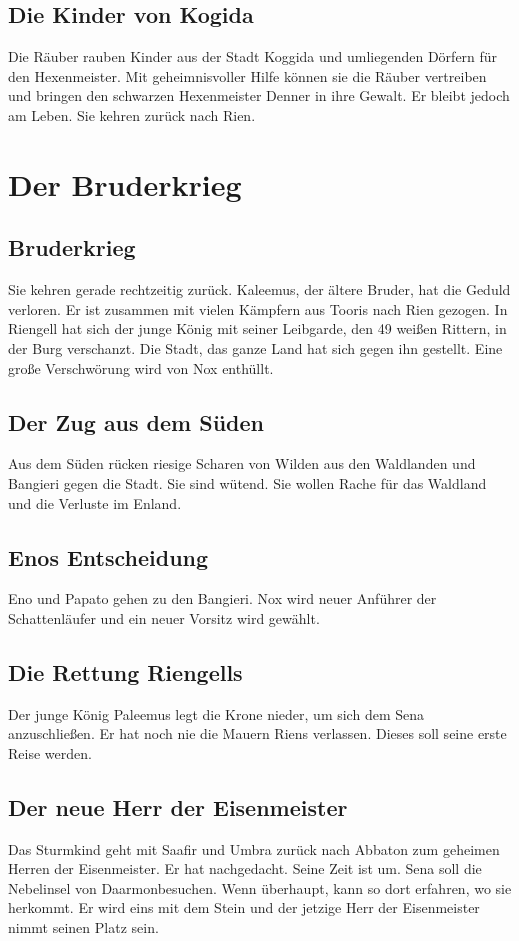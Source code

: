 \documentclass[12pt,a4paper,onecolumn,oneside,ngerman]{book}
\newcommand{\Sena}{Sena}
\newcommand{\Sturmkind}{Sturmkind}
\newcommand{\Bangiri}{Bangieri}
\newcommand{\Papato}{Papato}
\newcommand{\Enland}{Enland}
\newcommand{\Schattenlaufer}{Schattenläufer}
\newcommand{\Eno}{Eno}
\newcommand{\Nox}{Nox}
\newcommand{\Umbra}{Umbra}
\newcommand{\Rhingell}{Riengell}
\newcommand{\Rhin}{Rien}
\newcommand{\Palemus}{Paleemus}
\newcommand{\Kalemus}{Kaleemus}
\newcommand{\Kogida}{Koggida}
\newcommand{\Denner}{Denner}
\newcommand{\Toris}{Tooris}
\newcommand{\Darmon}{Daarmon}
\newcommand{\Eisenmeister}{Eisenmeister}
\newcommand{\Abaton}{Abbaton}
\newcommand{\Safir}{Saafir}
\begin{document}
\chapter{Die Kinder von Kogida}
Die Räuber rauben Kinder aus der Stadt {\Kogida} und umliegenden Dörfern für den Hexenmeister. Mit geheimnisvoller Hilfe können sie die Räuber vertreiben und bringen den schwarzen Hexenmeister {\Denner} in ihre Gewalt. Er bleibt jedoch am Leben. Sie kehren zurück nach {\Rhin}.

\part{Der Bruderkrieg}
\chapter{Bruderkrieg}
Sie kehren gerade rechtzeitig zurück. {\Kalemus}, der ältere Bruder, hat die Geduld verloren. Er ist zusammen mit vielen Kämpfern aus {\Toris} nach {\Rhin} gezogen. In {\Rhingell} hat sich der junge König mit seiner Leibgarde, den 49 weißen Rittern, in der Burg verschanzt. Die Stadt, das ganze Land hat sich gegen ihn gestellt.\linebreak
Eine große Verschwörung wird von {\Nox} enthüllt.

\chapter{Der Zug aus dem Süden}
Aus dem Süden rücken riesige Scharen von Wilden aus den Waldlanden und {\Bangiri} gegen die Stadt. Sie sind wütend. Sie wollen Rache für das Waldland und die Verluste im {\Enland}.

\chapter{{\Eno}s Entscheidung}
{\Eno} und {\Papato} gehen zu den {\Bangiri}.\linebreak
{\Nox} wird neuer Anführer der {\Schattenlaufer} und ein neuer Vorsitz wird gewählt.

\chapter{Die Rettung \Rhingell{s}}
Der junge König {\Palemus} legt die Krone nieder, um sich dem {\Sena} anzuschließen. Er hat noch nie die Mauern \Rhin{s} verlassen. Dieses soll seine erste Reise werden.

\chapter{Der neue Herr der {\Eisenmeister}}
Das {\Sturmkind} geht mit {\Safir} und {\Umbra} zurück nach {\Abaton} zum geheimen Herren der {\Eisenmeister}.\linebreak
Er hat nachgedacht. Seine Zeit ist um. {\Sena} soll die Nebelinsel von \Darmon besuchen. Wenn überhaupt, kann so dort erfahren, wo sie herkommt. Er wird eins mit dem Stein und der jetzige Herr der {\Eisenmeister} nimmt seinen Platz sein.
\end{document}
